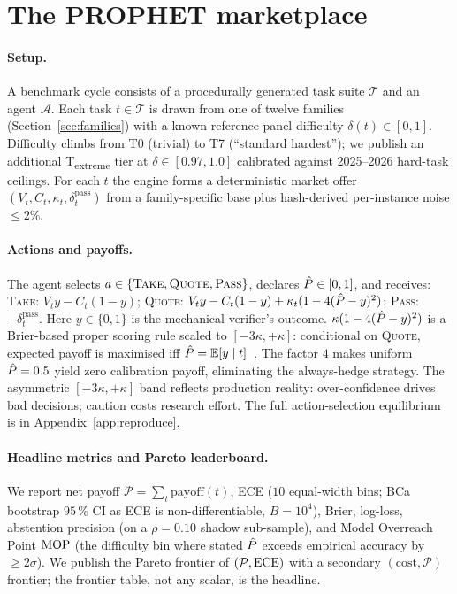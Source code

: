 \section{The PROPHET marketplace}\label{sec:method}

\paragraph{Setup.}
A benchmark cycle consists of a procedurally generated task suite
$\mathcal{T}$ and an agent $\mathcal{A}$. Each task
$t \in \mathcal{T}$ is drawn from one of twelve families
(Section~\ref{sec:families}) with a known reference-panel difficulty
$\delta(t) \in [0, 1]$. Difficulty climbs from T0 (trivial) to T7
(``standard hardest''); we publish an additional
T\textsubscript{extreme} tier at $\delta \in [0.97, 1.0]$ calibrated
against 2025--2026 hard-task ceilings. For each $t$ the engine forms a
deterministic market offer
$(V_t, C_t, \kappa_t, \delta^{\mathrm{pass}}_t)$ from a family-specific
base plus hash-derived per-instance noise $\le 2\%$.

\paragraph{Actions and payoffs.}
The agent selects $a \in \{\textsc{Take}, \textsc{Quote},
\textsc{Pass}\}$, declares $\hat{P} \in [0, 1]$, and receives:
\textsc{Take}: $V_t y - C_t (1-y)$;
\textsc{Quote}: $V_t y - C_t (1-y) + \kappa_t (1 - 4(\hat{P} - y)^2)$;
\textsc{Pass}: $-\delta^{\mathrm{pass}}_t$.
Here $y \in \{0, 1\}$ is the mechanical verifier's outcome.
$\kappa(1 - 4(\hat{P} - y)^2)$ is a Brier-based proper scoring rule
scaled to $[-3\kappa, +\kappa]$: conditional on \textsc{Quote},
expected payoff is maximised iff
$\hat{P} = \mathbb{E}[y \mid t]$~\citep{brier1950,gneiting2007}. The
factor $4$ makes uniform $\hat{P} = 0.5$ yield zero calibration payoff,
eliminating the always-hedge strategy. The asymmetric
$[-3\kappa, +\kappa]$ band reflects production reality: over-confidence
drives bad decisions; caution costs research effort. The full
action-selection equilibrium is in Appendix~\ref{app:reproduce}.

\paragraph{Headline metrics and Pareto leaderboard.}
We report net payoff $\mathcal{P} = \sum_t \mathrm{payoff}(t)$, ECE
($10$ equal-width bins; BCa bootstrap $95\,\%$ CI as ECE is
non-differentiable, $B = 10^4$), Brier, log-loss, abstention precision
(on a $\rho = 0.10$ shadow sub-sample), and Model Overreach Point
$\mathrm{MOP}$ (the difficulty bin where stated $\hat{P}$ exceeds empirical
accuracy by $\ge 2\sigma$). We publish the Pareto frontier of
$(\mathcal{P}, \mathrm{ECE})$ with a secondary $(\text{cost}, \mathcal{P})$
frontier; the frontier table, not any scalar, is the headline.

